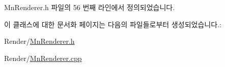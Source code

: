 Mn\+Renderer.\+h 파일의 56 번째 라인에서 정의되었습니다.



이 클래스에 대한 문서화 페이지는 다음의 파일들로부터 생성되었습니다.\+:\begin{DoxyCompactItemize}
\item 
Render/\hyperlink{_mn_renderer_8h}{Mn\+Renderer.\+h}\item 
Render/\hyperlink{_mn_renderer_8cpp}{Mn\+Renderer.\+cpp}\end{DoxyCompactItemize}
